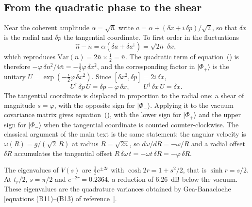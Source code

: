 \documentclass{iopjournal}
\newcommand{\nbar}{\bar{n}}
\newcommand{\ket}[1]{|#1\rangle}
\begin{document}
\subsection{From the quadratic phase to the shear}
Near the coherent amplitude $\alpha = \sqrt{\nbar}$ write $a = \alpha + (\delta x + i\,\delta p)/\sqrt{2}$, so that $\delta x$ is the radial and $\delta p$ the tangential coordinate. To first order in the fluctuations
\begin{equation}
\hat{n} - \nbar = \alpha(\delta a + \delta a^\dagger) = \sqrt{2\nbar}\;\delta x,
\end{equation}
which reproduces $\mathrm{Var}(n) = 2\nbar\times\tfrac12 = \nbar$. The quadratic term of equation~() is therefore $-\varphi\,\delta n^2/4\nbar = -\tfrac12\varphi\,\delta x^2$, and the corresponding factor in $\ket{\Phi_+}$ is the unitary $U = \exp(-\tfrac{i}{2}\varphi\,\delta x^2)$. Since $[\delta x^2, \delta p] = 2i\,\delta x$,
\begin{equation}
U^\dagger\,\delta p\,U = \delta p - \varphi\,\delta x,\qquad U^\dagger\,\delta x\,U = \delta x.
\end{equation}
The tangential coordinate is displaced in proportion to the radial one: a shear of magnitude $s = \varphi$, with the opposite sign for $\ket{\Phi_-}$. Applying it to the vacuum covariance matrix gives equation~(), with the lower sign for $\ket{\Phi_+}$ and the upper sign for $\ket{\Phi_-}$ when the tangential coordinate is counted counter-clockwise. The classical argument of the main text is the same statement: the angular velocity is $\omega(R) = g/(\sqrt{2}\,R)$ at radius $R = \sqrt{2n}$, so $d\omega/dR = -\omega/R$ and a radial offset $\delta R$ accumulates the tangential offset $R\,\delta\omega\,t = -\omega t\,\delta R = -\varphi\,\delta R$.

The eigenvalues of $V(s)$ are $\tfrac12 e^{\pm2r}$ with $\cosh 2r = 1+s^2/2$, that is $\sinh r = s/2$. At $t_r/2$, $s = \pi/2$ and $e^{-2r} = 0.2364$, a reduction of 6.26~dB below the vacuum. These eigenvalues are the quadrature variances obtained by Gea-Banacloche [equations (B11)--(B13) of reference~\cite{S-gea1991}].
\end{document}

